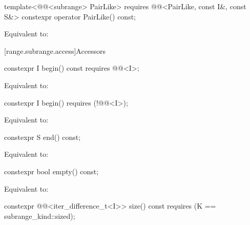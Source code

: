 %
\begin{itemdecl}
template<@@<subrange> PairLike>
  requires @@<PairLike, const I&, const S&>
constexpr operator PairLike() const;
\end{itemdecl}

\begin{itemdescr}
\pnum
\effects
Equivalent to: 
\end{itemdescr}

[range.subrange.access]{Accessors}

%
\begin{itemdecl}
constexpr I begin() const requires @@<I>;
\end{itemdecl}

\begin{itemdescr}
\pnum
\effects
Equivalent to: 
\end{itemdescr}

%
\begin{itemdecl}
constexpr I begin() requires (!@@<I>);
\end{itemdecl}

\begin{itemdescr}
\pnum
\effects
Equivalent to: 
\end{itemdescr}

%
\begin{itemdecl}
constexpr S end() const;
\end{itemdecl}

\begin{itemdescr}
\pnum
\effects
Equivalent to: 
\end{itemdescr}

%
\begin{itemdecl}
constexpr bool empty() const;
\end{itemdecl}

\begin{itemdescr}
\pnum
\effects
Equivalent to: 
\end{itemdescr}

%
\begin{itemdecl}
constexpr @@<iter_difference_t<I>> size() const
  requires (K == subrange_kind::sized);
\end{itemdecl}

